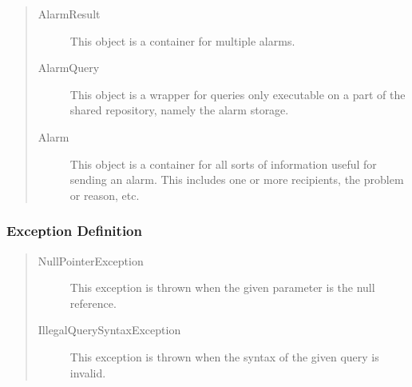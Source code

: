 \begin{quote}
	\begin{description}
		\item[AlarmResult] This object is a container for multiple alarms. 
		\item[AlarmQuery] This object is a wrapper for queries only executable on a
		part of the shared repository, namely the alarm storage.
		\item[Alarm] This object is a container for all sorts of information useful
		for sending an alarm. This includes one or more recipients, the problem or reason,
		etc.
	\end{description} 
\end{quote}

\subsubsection{Exception Definition} 

\begin{quote}
	\begin{description}
		\item[NullPointerException] This exception is thrown when the given parameter
		is the null reference.
		\item[IllegalQuerySyntaxException] This exception is thrown when the syntax of
		the given query is invalid.
	\end{description} 
\end{quote}